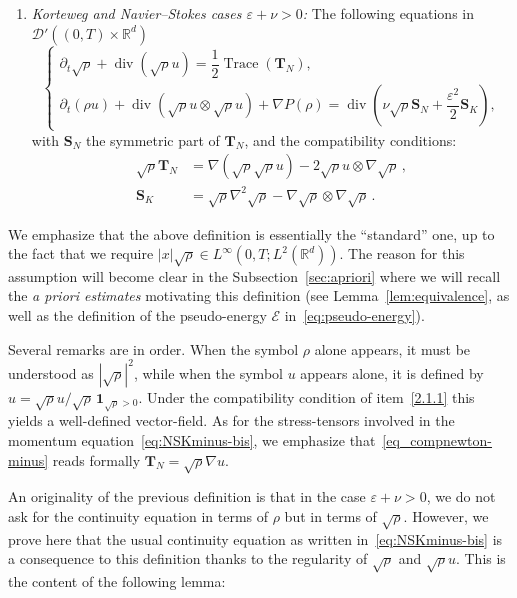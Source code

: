 \documentclass[AHL,Unicode,longabstracts]{cedram}
\DeclareMathOperator{\DIV}{div}
\DeclareMathOperator{\Trace}{Trace}
\newcommand*\R{\mathbb{R}}
\newcommand*\<{\left\langle}
\renewcommand*\>{\right\rangle}
\newcommand*\eps{\varepsilon}
\begin{document}
\begin{defi}
\begin{enumerate}
\item \label{2.1.3} \emph{Korteweg and Navier--Stokes cases $\eps + \nu > 0$:} The following equations in $\mathcal D'((0,T)\times \mathbb R^d)$
\begin{equation}\label{eq:NSKminus-bis}
\begin{cases}
\partial_t\sqrt{\rho}+\DIV (\sqrt{\rho} u)= \dfrac{1}{2}\Trace(\mathbf T_N),\\
\partial_t ({\rho}u) +\DIV (\sqrt{\rho}u \otimes \sqrt{\rho}u) + \nabla P(\rho) =\DIV \left(\nu\sqrt \rho \mathbf S_N + \dfrac{\varepsilon^2}{2} \mathbf S_K\right)\!,
\end{cases}
\end{equation}
with $\mathbf S_N$ the symmetric part of $\mathbf T_N$, and the compatibility conditions:
\begin{align}\label{eq_compnewton-minus}
\sqrt{\rho}\mathbf T_{N} &= \nabla(\sqrt{\rho} \sqrt{\rho} u) - 2 \sqrt{\rho}u \otimes \nabla \sqrt{\rho}\,, \\
\mathbf S_K &=\sqrt{\rho}\nabla^2 \sqrt{\rho} - \nabla \sqrt{\rho} \otimes \nabla
\sqrt{\rho}\,. \label{eq_compbohm-minus}
\end{align}
\end{enumerate}
\end{defi}

We emphasize that the above definition is essentially the ``standard'' one, up to the fact that we require $|x|\sqrt\rho\in L^\infty(0,T;L^2(\R^d))$. The reason for this assumption will become clear in the Subsection~\ref{sec:apriori} where we will recall the \emph{a priori estimates} motivating this definition (see Lemma~\ref{lem:equivalence}, as well as the definition of the pseudo-energy $\mathcal E$ in~\eqref{eq:pseudo-energy}).

Several remarks are in order. When the symbol $\rho$ alone appears, it must be understood as $|\sqrt{\rho}|^2$, while when the symbol $u$ appears alone, it is defined by $u =
\sqrt{\rho}u/\sqrt{\rho}\,\mathbf 1_{\sqrt{\rho}>0}.$ Under the compatibility condition of item~\eqref{2.1.1} this yields a well-defined vector-field. As for the stress-tensors involved in the momentum equation~\eqref{eq:NSKminus-bis}, we emphasize that~\eqref{eq_compnewton-minus} reads formally $\mathbf T_N = \sqrt{\rho} \nabla u.$

An originality of the previous definition is that in the case $\eps+\nu>0$, we do not ask for the continuity equation in terms of $\rho$ but in terms of $\sqrt{\rho}.$ However, we prove here that the usual continuity equation as written in~\eqref{eq:NSKminus-bis} is a consequence to this definition thanks to the regularity of $\sqrt{\rho}$ and $\sqrt{\rho}u.$ This is the content of the following lemma:
\end{document}
